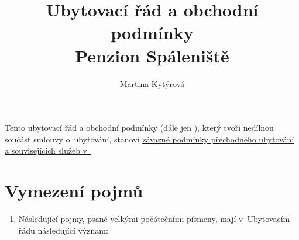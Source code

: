 \documentclass[a4paper]{scrartcl}
\title{Ubytovací řád a obchodní podmínky \\ {Penzion Spáleniště} }
\author{Martina Kytýrová}
\begin{document}
\maketitle

Tento ubytovací řád a obchodní podmínky (dále jen ), který tvoří nedílnou součást smlouvy o~ubytování, stanoví
\uline{závazné podmínky přechodného ubytování a souvisejících služeb
  v~}

\section{Vymezení pojmů}

\begin{enumerate}

  \item
        Následující pojmy, psané velkými počátečními písmeny, mají
        v~Ubytovacím řádu následující význam:

        \begin{enumerate}


\end{enumerate}
\end{enumerate}
\end{document}
